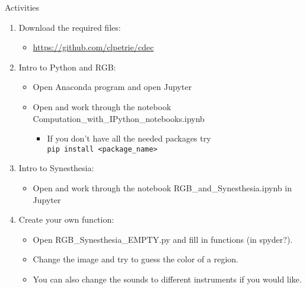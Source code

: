 \documentclass{beamer}
\begin{document}
\begin{frame}{Activities}
   \begin{enumerate}
      \item Download the required files:
      \begin{itemize}
         \item \href{https://github.com/clpetrie/cdec}{https://github.com/clpetrie/cdec}
      \end{itemize}
      \item Intro to Python and RGB:
      \begin{itemize}
         \item Open Anaconda program and open Jupyter
         \item Open and work through the notebook Computation\_with\_IPython\_notebooks.ipynb
         \begin{itemize}
            \item If you don't have all the needed packages try \\ \texttt{pip install <package\_name>}
         \end{itemize}
      \end{itemize}
      \item Intro to Synesthesia:
      \begin{itemize}
         \item Open and work through the notebook RGB\_and\_Synesthesia.ipynb in Jupyter
      \end{itemize}
      \item Create your own function:
      \begin{itemize}
         \item Open RGB\_Synesthesia\_EMPTY.py and fill in functions (in spyder?).
         \item Change the image and try to guess the color of a region.
         \item You can also change the sounds to different instruments if you would like.
      \end{itemize}
   \end{enumerate}
\end{frame}
\end{document}
